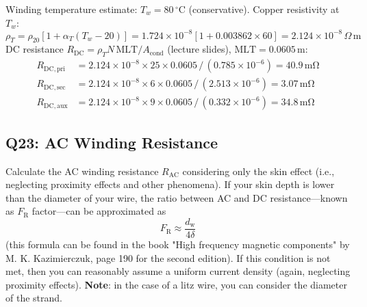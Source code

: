 \documentclass{PELsmallreport}
\begin{document}
\begin{framed}
Winding temperature estimate: $T_w = 80\,^\circ\mathrm{C}$ (conservative). Copper resistivity at $T_w$:
\begin{equation}
    \rho_T = \rho_{20}[1+\alpha_T(T_w-20)] = 1.724\!\times\!10^{-8}[1+0.003862\times60] = 2.124\!\times\!10^{-8}\,\Omega\,\mathrm{m}
\end{equation}
DC resistance $R_\mathrm{DC} = \rho_T N\,\mathrm{MLT}/A_\mathrm{cond}$ (lecture slides), $\mathrm{MLT}=0.0605\,\mathrm{m}$:
\begin{align}
    R_\mathrm{DC,pri} &= 2.124\!\times\!10^{-8}\times25\times0.0605\,/\,(0.785\!\times\!10^{-6}) = 40.9\,\mathrm{m\Omega}\\
    R_\mathrm{DC,sec} &= 2.124\!\times\!10^{-8}\times6\times0.0605\,/\,(2.513\!\times\!10^{-6}) = 3.07\,\mathrm{m\Omega}\\
    R_\mathrm{DC,aux} &= 2.124\!\times\!10^{-8}\times9\times0.0605\,/\,(0.332\!\times\!10^{-6}) = 34.8\,\mathrm{m\Omega}
\end{align}
\end{framed}

 \quad 
{} \quad 
{} \quad 
{} \hfill{}







\subsection{Q23: AC Winding Resistance} 
Calculate the AC winding resistance $R_\mathrm{AC}$ considering only the skin effect (i.e., neglecting proximity effects and other phenomena). 
If your skin depth is lower than the diameter of your wire, the ratio between AC and DC resistance---known as $F_\mathrm{R}$ factor---can be approximated as 
\begin{equation}
    F_\mathrm{R} \approx \frac{d_\mathrm{w}}{4\delta} 
\end{equation}
(this formula can be found in the book "High frequency magnetic components" by M. K. Kazimierczuk, page 190 for the second edition). 
If this condition is not met, then you can reasonably assume a uniform current density (again, neglecting proximity effects). 
\textbf{Note}: in the case of a litz wire, you can consider the diameter of the strand. 
\end{document}
